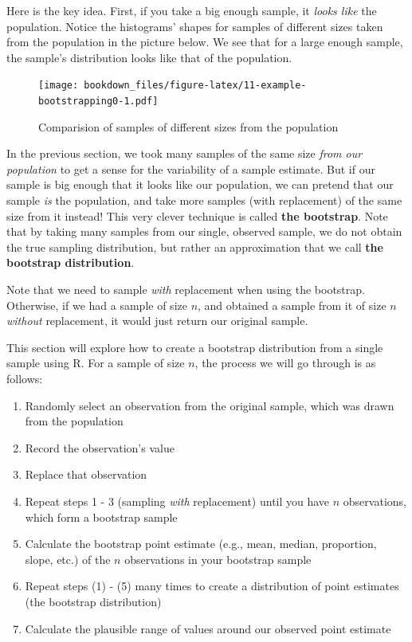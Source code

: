 \documentclass[
]{krantz}
\providecommand{\tightlist}{%
  \setlength{\itemsep}{0pt}\setlength{\parskip}{0pt}}
\renewenvironment{quote}{\begin{VF}}{\end{VF}}
\begin{document}
Here is the key idea. First, if you take a big enough sample, it \emph{looks like} the population. Notice the histograms' shapes for samples of different sizes taken from the population in the picture below. We see that for a large enough sample, the sample's distribution looks like that of the population.

\begin{figure}
\centering
\texttt{[image: bookdown\_files/figure-latex/11-example-bootstrapping0-1.pdf]}
\caption{\label{fig:11-example-bootstrapping0}Comparision of samples of different sizes from the population}
\end{figure}

In the previous section, we took many samples of the same size \emph{from our population} to get
a sense for the variability of a sample estimate. But if our sample is big enough that it looks like our population,
we can pretend that our sample \emph{is} the population, and take more samples (with replacement) of the same size
from it instead! This very clever technique is called \textbf{the bootstrap}.
Note that by taking many samples from our single, observed sample, we do not obtain the true sampling distribution,
but rather an approximation that we call \textbf{the bootstrap distribution}.

\begin{quote}
Note that we need to sample \emph{with} replacement when using the bootstrap. Otherwise, if we had a sample of size \(n\),
and obtained a sample from it of size \(n\) \emph{without} replacement, it would just return our original sample.
\end{quote}

This section will explore how to create a bootstrap distribution from a single sample using R.
For a sample of size \(n\), the process we will go through is as follows:

\begin{enumerate}
\def\labelenumi{\arabic{enumi}.}
\tightlist
\item
  Randomly select an observation from the original sample, which was drawn from the population
\item
  Record the observation's value
\item
  Replace that observation
\item
  Repeat steps 1 - 3 (sampling \emph{with} replacement) until you have \(n\) observations, which form a bootstrap sample
\item
  Calculate the bootstrap point estimate (e.g., mean, median, proportion, slope, etc.) of the \(n\) observations in your bootstrap sample
\item
  Repeat steps (1) - (5) many times to create a distribution of point estimates (the bootstrap distribution)
\item
  Calculate the plausible range of values around our observed point estimate
\end{enumerate}
\end{document}
